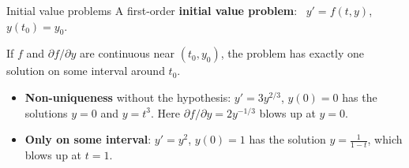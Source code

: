 \documentclass[10pt]{wosm-slides}
\begin{document}
\begin{frame}{Initial value problems}
  A first-order \textbf{initial value problem}: \ $y' = f(t, y)$, \ $y(t_0) = y_0$.
  \pause
  \begin{theorem}
    If $f$ and $\partial f / \partial y$ are continuous near $(t_0, y_0)$, the problem has exactly one
    solution on some interval around $t_0$.
  \end{theorem}
  \pause
  \begin{itemize}
    \item \textbf{Non-uniqueness} without the hypothesis: $y' = 3y^{2/3}$, $y(0) = 0$ has the solutions
      $y = 0$ and $y = t^3$. Here $\partial f/\partial y = 2y^{-1/3}$ blows up at $y = 0$.
    \item \textbf{Only on some interval}: $y' = y^2$, $y(0) = 1$ has the solution $y = \frac{1}{1 - t}$,
      which blows up at $t = 1$.
  \end{itemize}
\end{frame}
\end{document}
